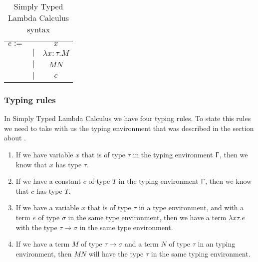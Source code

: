 \begin{table}[]
    \centering
    \begin{tabular}{c c c}
         $e :=$&  & $x$\\
         & $|$ & $\lambda x:\tau.M$ \\
         & $|$ &  $M N$ \\
         & $|$ &  $c$ \\
    \end{tabular}
    \caption{Simply Typed Lambda Calculus syntax}
    \label{tab:STLC syntax}
\end{table}

\subsubsection{Typing rules}
In Simply Typed Lambda Calculus we have four typing rules. To state this rules we need to take with us the typing environment that was described in the section 
about .

\begin{enumerate}
    \item If we have variable $x$ that is of type $\tau$ in the typing environment $\Upgamma$, then we know that $x$ has type $\tau$.
    \item If we have a constant $c$ of type $T$ in the typing environment $\Upgamma$, then we know that $c$ has type $T$.
    \item If we have a variable $x$ that is of type $\tau$ in a type environment, and with a term $e$ of type $\sigma$ in the same type environment, then we have a term $\lambda x\tau .e$ with the type $\tau \rightarrow \sigma$ in the same type environment.
    \item If we have a term $M$ of type $\tau \rightarrow \sigma$ and a term $N$ of type $\tau$ in an typing environment, then $M N$ will have the type $\tau$ in the same typing environment.
\end{enumerate}


